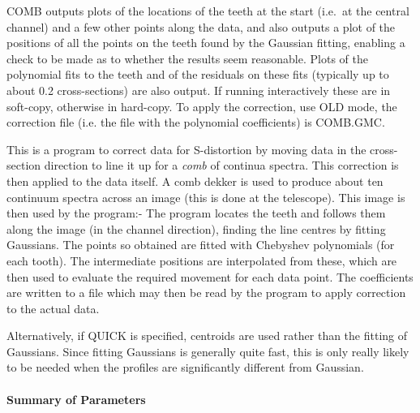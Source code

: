 COMB outputs plots of the locations of the teeth at the start (i.e.\ at
the central channel) and a few other points along the data, and also
outputs a plot of the positions of all the points on the teeth found by
the Gaussian fitting, enabling a check to be made as to whether the
results seem reasonable.
Plots of the polynomial fits to the teeth and of the residuals on these
fits (typically up to about 0.2 cross-sections) are also output. If
running interactively these are in soft-copy, otherwise in hard-copy.
To apply the correction, use OLD mode, the correction file (i.e. the
file with the polynomial coefficients) is COMB.GMC.

This is a program to correct data for S-distortion by moving data in
the cross-section direction to line it up for a {\em comb} of continua
spectra. This correction is then applied to the data itself. A comb
dekker is used to produce about ten continuum spectra across an image
(this is done at the telescope). This image is then used by the
program:- The program locates the teeth and follows them along the
image (in the channel direction), finding the line centres by fitting
Gaussians. The points so obtained are fitted with Chebyshev polynomials
(for each tooth). The intermediate positions are interpolated from
these, which are then used to evaluate the required movement for each
data point. The coefficients are written to a file which may then be
read by the program to apply correction to the actual data. 

Alternatively, if QUICK is specified, centroids are used rather than
the fitting of Gaussians.
Since fitting Gaussians is generally quite fast, this is only really
likely to be needed when the profiles are significantly different from
Gaussian.

\paragraph{Summary of Parameters}

